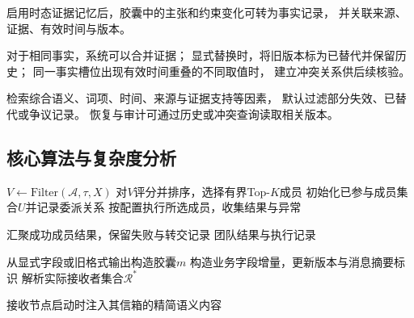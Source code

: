 启用时态证据记忆后，胶囊中的主张和约束变化可转为事实记录，
并关联来源、证据、有效时间与版本。

对于相同事实，系统可以合并证据；
显式替换时，将旧版本标为已替代并保留历史；
同一事实槽位出现有效时间重叠的不同取值时，
建立冲突关系供后续核验。

检索综合语义、词项、时间、来源与证据支持等因素，
默认过滤部分失效、已替代或争议记录。
恢复与审计可通过历史或冲突查询读取相关版本。



\subsection{核心算法与复杂度分析}

\begin{algorithm}[H]
    \caption{动态异构成员协作}
    \label{alg:mesh_collaboration}

    $V\leftarrow\mathrm{Filter}(\mathcal{A},\tau,X)$\;
    对$V$评分并排序，选择有界Top-$K$成员\;
    初始化已参与成员集合$U$并记录委派关系\;
    按配置执行所选成员，收集结果与异常\;



    汇聚成功成员结果，保留失败与转交记录\;
    \Return 团队结果与执行记录\;
\end{algorithm}

\begin{algorithm}[t]
    \caption{接收方感知的胶囊通信}
    \label{alg:mesh_transport}

    从显式字段或旧格式输出构造胶囊$m$\;
    构造业务字段增量，更新版本与消息摘要标识\;
    解析实际接收者集合$\mathcal{R}^{*}$\;


    接收节点启动时注入其信箱的精简语义内容\;
\end{algorithm}

